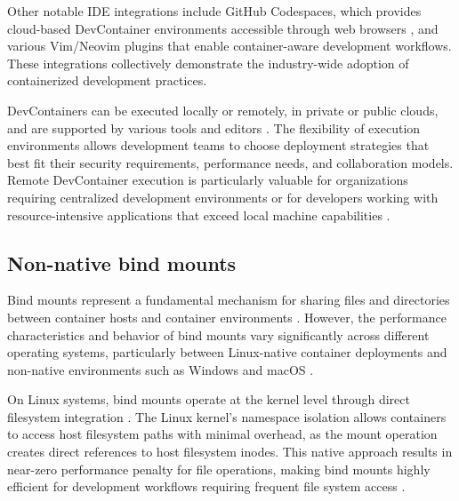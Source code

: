 Other notable IDE integrations include GitHub Codespaces, which provides cloud-based DevContainer environments accessible through web browsers \citep{githubIntroductionDevContainers2025}, and various Vim/Neovim plugins that enable container-aware development workflows.
These integrations collectively demonstrate the industry-wide adoption of containerized development practices.

DevContainers can be executed locally or remotely, in private or public clouds, and are supported by various tools and editors \citep{DevelopmentContainers2025}.
The flexibility of execution environments allows development teams to choose deployment strategies that best fit their security requirements, performance needs, and collaboration models.
Remote DevContainer execution is particularly valuable for organizations requiring centralized development environments or for developers working with resource-intensive applications that exceed local machine capabilities \citep{githubIntroductionDevContainers2025}.

\subsection{Non-native bind mounts}
Bind mounts represent a fundamental mechanism for sharing files and directories between container hosts and container environments \citep{dockerDockerReferenceDocumentation2025}.
However, the performance characteristics and behavior of bind mounts vary significantly across different operating systems, particularly between Linux-native container deployments and non-native environments such as Windows and macOS \citep{dockerDockerDesktopWSL2020,cncfDockerMacOSSlow2023}.

On Linux systems, bind mounts operate at the kernel level through direct filesystem integration \citep{jainLinuxContainersVirtualization2023}.
The Linux kernel's namespace isolation allows containers to access host filesystem paths with minimal overhead, as the mount operation creates direct references to host filesystem inodes.
This native approach results in near-zero performance penalty for file operations, making bind mounts highly efficient for development workflows requiring frequent file system access \citep{felterUpdatedPerformanceComparison2015}.


